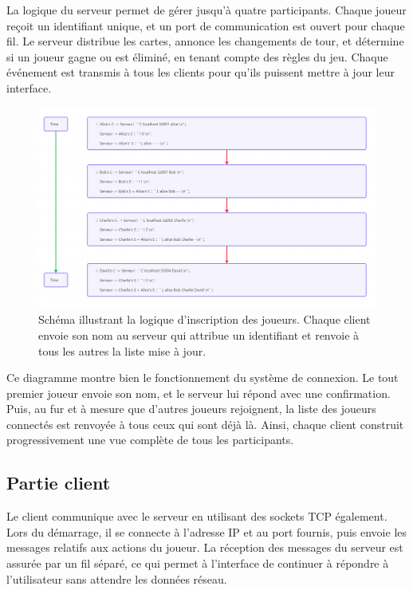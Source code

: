 \documentclass{article}
\begin{document}
La logique du serveur permet de gérer jusqu'à quatre participants. 
Chaque joueur reçoit un identifiant unique, et un port de communication est ouvert pour chaque fil. 
Le serveur distribue les cartes, annonce les changements de tour, et détermine si un joueur gagne ou est éliminé, en tenant compte des règles du jeu. 
Chaque événement est transmis à tous les clients pour qu'ils puissent mettre à jour leur interface.

\begin{figure}[H]
    \centering
    \includegraphics[width=0.95\linewidth]{images/Logique_de_connexion_des utilisateurs.PNG}
    \caption{Schéma illustrant la logique d'inscription des joueurs. Chaque client envoie son nom au serveur qui attribue un identifiant et renvoie à tous les autres la liste mise à jour.}
\end{figure}
    
Ce diagramme montre bien le fonctionnement du système de connexion. 
Le tout premier joueur envoie son nom, et le serveur lui répond avec une confirmation. 
Puis, au fur et à mesure que d'autres joueurs rejoignent, la liste des joueurs connectés est renvoyée à tous ceux qui sont déjà là. 
Ainsi, chaque client construit progressivement une vue complète de tous les participants.


\subsection{Partie client}

Le client communique avec le serveur en utilisant des sockets TCP également. 
Lors du démarrage, il se connecte à l'adresse IP et au port fournis, puis envoie les messages relatifs aux actions du joueur. 
La réception des messages du serveur est assurée par un fil séparé, ce qui permet à l'interface de continuer à répondre à l'utilisateur sans attendre les données réseau.
\end{document}
